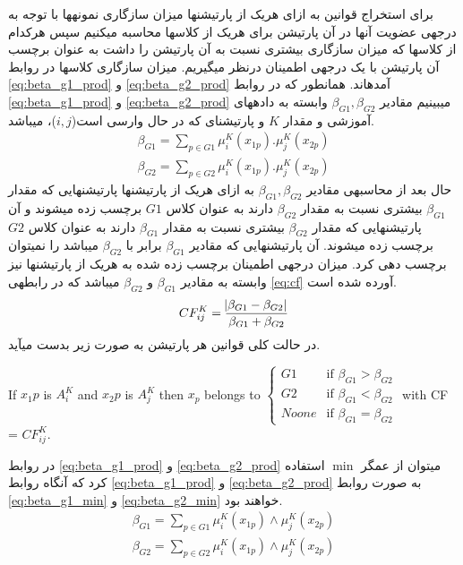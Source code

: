 \documentclass[10pt,a4paper]{article}
\newcommand{\نیمفاصله}{\halfspace}
\renewcommand{\ }{\halfspace}
\begin{document}
\label{sec:rule_extraction}
برای استخراج قوانین به ازای هریک از پارتیشن\ ها میزان سازگاری نمونه\ ها با توجه به درجه\ ی عضویت آن\ ها در آن پارتیشن برای هریک از کلاس\ ها محاسبه می\ کنیم سپس هرکدام از کلاس\ ها که میزان سازگاری بیشتری نسبت به آن پارتیشن را داشت به عنوان برچسب آن پارتیشن با یک درجه\ ی اطمینان درنظر می\ گیریم. میزان سازگاری کلاس\ ها در روابط
\ref{eq:beta_g1_prod} و \ref{eq:beta_g2_prod}
آمده\ اند. همان\ طور که در روابط
\ref{eq:beta_g1_prod} و \ref{eq:beta_g2_prod}
می\ بینیم مقادیر
$\beta_{G1}, \beta_{G2}$
وابسته به داده\ های آموزشی و مقدار $K$ و پارتیشن\ ای که در حال وارسی است($i, j$)، می\ باشد.
\begin{eqnarray}
    \beta_{G1} = \sum_{p \in G1} \mu_i^K(x_{1p}) . \mu_j^K(x_{2p})\label{eq:beta_g1_prod}\\
    \beta_{G2} = \sum_{p \in G2} \mu_i^K(x_{1p}) . \mu_j^K(x_{2p})\label{eq:beta_g2_prod}
\end{eqnarray}
حال بعد از محاسبه\ ی مقادیر
$\beta_{G1}, \beta_{G2}$
به ازای هریک از پارتیشن\ ها پارتیشن\ هایی که مقدار
$\beta_{G1}$
بیشتری نسبت به مقدار
$\beta_{G2}$
دارند به عنوان کلاس
$G1$
برچسب زده می\ شوند و آن پارتیشن\ هایی که مقدار
$\beta_{G2}$
بیشتری نسبت به مقدار
$\beta_{G1}$
دارند به عنوان کلاس
$G2$
برچسب زده می\ شوند. آن پارتیشن\ هایی که مقادیر
$\beta_{G1}$
برابر با
$\beta_{G2}$
می\ باشد را نمی\ توان برچسب دهی کرد. میزان درجه\ ی اطمینان برچسب زده شده به هریک از پارتیشن\ ها نیز وابسته به مقادیر
$\beta_{G1}$
و
$\beta_{G2}$
می\ باشد که در رابطه\ ی
\ref{eq:cf}
آورده شده است.
\begin{equation}
CF_{ij}^K = \frac{\abs{\beta_{G1} - \beta_{G2}}}{\beta_{G1} + \beta_{G2}}
\label{eq:cf}
\end{equation}
در حالت کلی قوانین هر پارتیشن به صورت زیر بدست می\ آید.
\begin{latin}\small
If $x_1p$ is $A_i^K$ and $x_2p$ is $A_j^K$ then $x_p$ belongs to $
\begin{cases}
G1 & \text{if }\beta_{G1} > \beta_{G2} \\
G2 & \text{if }\beta_{G1} < \beta_{G2} \\
Noone & \text{if }\beta_{G1} = \beta_{G2}
\end{cases}$
\hspace{1em}with CF = $CF_{ij}^K$.
\end{latin}
در روابط
\ref{eq:beta_g1_prod} و \ref{eq:beta_g2_prod}
می\ توان از عمگر
$\min$
استفاده کرد که آنگاه روابط
\ref{eq:beta_g1_prod} و \ref{eq:beta_g2_prod}
به صورت روابط
\ref{eq:beta_g1_min} و \ref{eq:beta_g2_min}
خواهند بود.
\begin{eqnarray}
    \beta_{G1} = \sum_{p \in G1} \mu_i^K(x_{1p}) \wedge \mu_j^K(x_{2p})\label{eq:beta_g1_min}\\
    \beta_{G2} = \sum_{p \in G2} \mu_i^K(x_{1p}) \wedge \mu_j^K(x_{2p})\label{eq:beta_g2_min}
\end{eqnarray}
\end{document}
